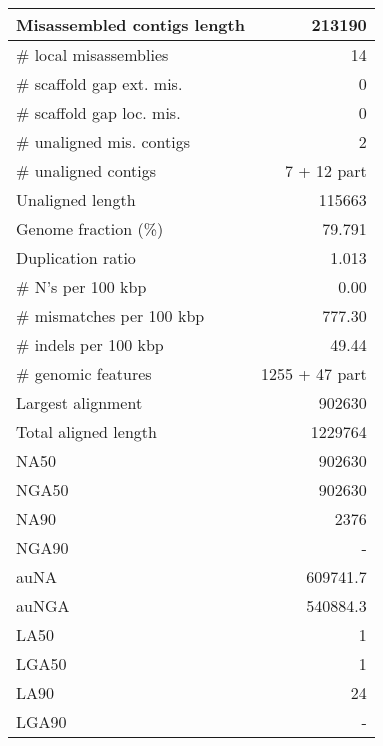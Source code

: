 \documentclass[12pt,a4paper]{article}
\begin{document}
\begin{table}[ht]
\begin{center}
\begin{tabular}{|l*{1}{|r}|}
Misassembled contigs length & 213190 \\ \hline
\# local misassemblies & 14 \\ \hline
\# scaffold gap ext. mis. & 0 \\ \hline
\# scaffold gap loc. mis. & 0 \\ \hline
\# unaligned mis. contigs & 2 \\ \hline
\# unaligned contigs & 7 + 12 part \\ \hline
Unaligned length & 115663 \\ \hline
Genome fraction (\%) & 79.791 \\ \hline
Duplication ratio & 1.013 \\ \hline
\# N's per 100 kbp & 0.00 \\ \hline
\# mismatches per 100 kbp & 777.30 \\ \hline
\# indels per 100 kbp & 49.44 \\ \hline
\# genomic features & 1255 + 47 part \\ \hline
Largest alignment & 902630 \\ \hline
Total aligned length & 1229764 \\ \hline
NA50 & 902630 \\ \hline
NGA50 & 902630 \\ \hline
NA90 & 2376 \\ \hline
NGA90 & - \\ \hline
auNA & 609741.7 \\ \hline
auNGA & 540884.3 \\ \hline
LA50 & 1 \\ \hline
LGA50 & 1 \\ \hline
LA90 & 24 \\ \hline
LGA90 & - \\ \hline
\end{tabular}
\end{center}
\end{table}
\end{document}
